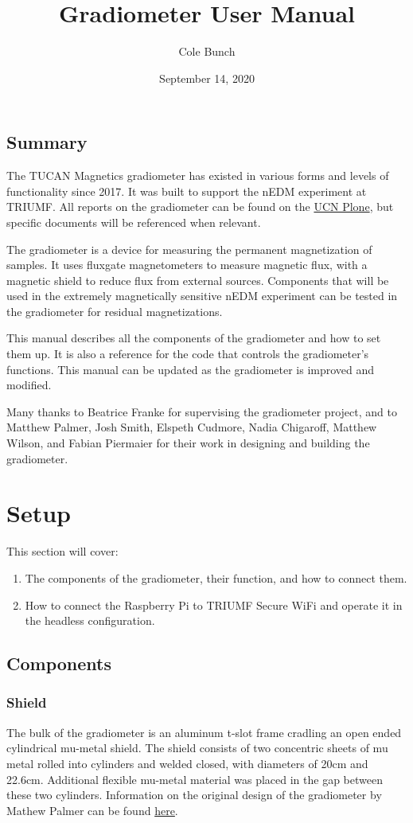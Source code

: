 \documentclass{TheMartianReport}
\title{Gradiometer User Manual} %
\author{Cole Bunch} %
\date{September 14, 2020} %
\begin{document}
\subsection{Summary} \label{ssec:Summary}
The TUCAN Magnetics gradiometer has existed in various forms and levels of functionality since 2017. It was built to support the nEDM experiment at TRIUMF. All reports on the gradiometer can be found on the \href{https://ucn.triumf.ca/edm/magnetic-shielding/gradiometer-setup-at-triumf/}{UCN Plone}, but specific documents will be referenced when relevant.

The gradiometer is a device for measuring the permanent magnetization of samples. It uses fluxgate magnetometers to measure magnetic flux, with a magnetic shield to reduce flux from external sources. Components that will be used in the extremely magnetically sensitive nEDM experiment can be tested in the gradiometer for residual magnetizations.

This manual describes all the components of the gradiometer and how to set them up. It is also a reference for the code that controls the gradiometer's functions. This manual can be updated as the gradiometer is improved and modified.

Many thanks to Beatrice Franke for supervising the gradiometer project, and to Matthew Palmer, Josh Smith, Elspeth Cudmore, Nadia Chigaroff, Matthew Wilson, and Fabian Piermaier for their work in designing and building the gradiometer.

\section{Setup} \label{sec:Setup}
This section will cover:
\begin{enumerate}
	\item The components of the gradiometer, their function, and how to connect them.
	\item How to connect the Raspberry Pi to TRIUMF Secure WiFi and operate it in the headless configuration.
\end{enumerate}

\subsection{Components}

\subsubsection{Shield}
The bulk of the gradiometer is an aluminum t-slot frame cradling an open ended cylindrical mu-metal shield. The shield consists of two concentric sheets of mu metal rolled into cylinders and welded closed, with diameters of 20cm and 22.6cm. Additional flexible mu-metal material was placed in the gap between these two cylinders. Information on the original design of the gradiometer by Mathew Palmer can be found \href{https://ucn.triumf.ca/edm/magnetic-shielding/gradiometer-setup-at-triumf/mp_work_term_report_rev3.pdf/view}{here}.
\end{document}
